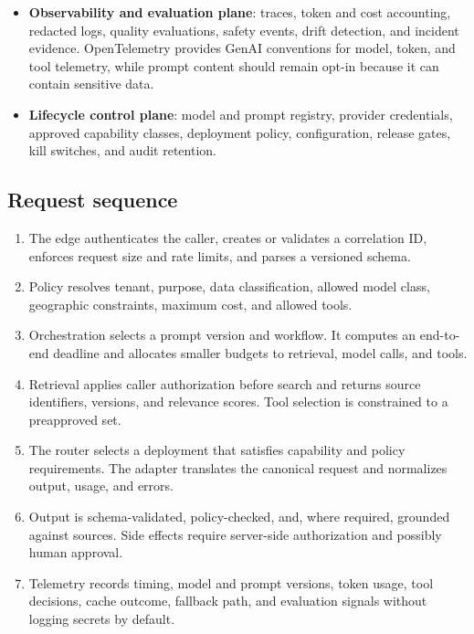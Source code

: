 \documentclass[10pt]{article}
\begin{document}
\begin{itemize}
  \item \textbf{Observability and evaluation plane}: traces, token and cost accounting, redacted logs, quality evaluations, safety events, drift detection, and incident evidence. OpenTelemetry provides GenAI conventions for model, token, and tool telemetry, while prompt content should remain opt-in because it can contain sensitive data.\cite{otel-genai}
  \item \textbf{Lifecycle control plane}: model and prompt registry, provider credentials, approved capability classes, deployment policy, configuration, release gates, kill switches, and audit retention.
\end{itemize}

\subsection{Request sequence}

\begin{enumerate}
  \item The edge authenticates the caller, creates or validates a correlation ID, enforces request size and rate limits, and parses a versioned schema.
  \item Policy resolves tenant, purpose, data classification, allowed model class, geographic constraints, maximum cost, and allowed tools.
  \item Orchestration selects a prompt version and workflow. It computes an end-to-end deadline and allocates smaller budgets to retrieval, model calls, and tools.
  \item Retrieval applies caller authorization before search and returns source identifiers, versions, and relevance scores. Tool selection is constrained to a preapproved set.
  \item The router selects a deployment that satisfies capability and policy requirements. The adapter translates the canonical request and normalizes output, usage, and errors.
  \item Output is schema-validated, policy-checked, and, where required, grounded against sources. Side effects require server-side authorization and possibly human approval.
  \item Telemetry records timing, model and prompt versions, token usage, tool decisions, cache outcome, fallback path, and evaluation signals without logging secrets by default.
\end{enumerate}
\end{document}

